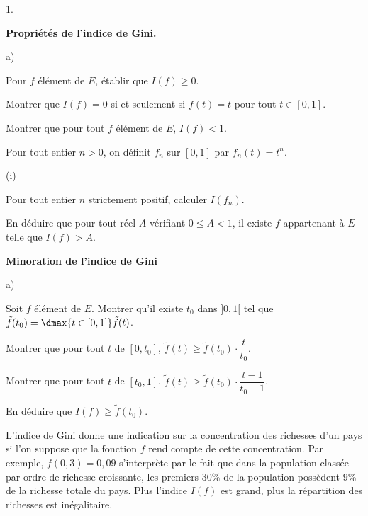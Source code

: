 \begin{noliste}{1.}
 \item \textbf{Propriétés de l'indice de Gini.}
 \begin{noliste}{a)}
  \item Pour $f$ élément de $E$, établir que $I(f) \geq 0$. 
  
  

  
  \item Montrer que $I(f) =0$ si et seulement si $f(t)=t$ pour tout $t 
  \in [0,1]$. 
  
  
  
  
  
  

  
  \item Montrer que pour tout $f$ élément de $E$, $I(f) < 1$.
  
  

  
  \item Pour tout entier $n >0$, on définit $f_n$ sur $[0,1]$ par 
  $f_n(t)=t^n$.
  \begin{nonoliste}{(i)}
    \item Pour tout entier $n$ strictement positif, calculer $I(f_n)$.
    
    

    
    \item En déduire que pour tout réel $A$ vérifiant $0 \leq A <1$, il 
    existe $f$ appartenant à $E$ telle que $I(f)>A$. 
    
    

  \end{nonoliste}
 \end{noliste}
 
 \item \textbf{Minoration de l'indice de Gini} 
 \begin{noliste}{a)}
  \item Soit $f$ élément de $E$. Montrer qu'il existe $t_0$ dans 
  $]0,1[$ tel que $\tilde{f}(t_0)= \dmax{t \in [0,1]} \tilde{f}(t)$. 
  
  

 
  \item Montrer que pour tout $t$ de $[0,t_0]$, $\tilde{f}(t) \geq 
  \tilde{f}(t_0) \cdot \dfrac{t}{t_0}$. 
  
  

  
  \item Montrer que pour tout $t$ de $[t_0,1]$, $\tilde{f}(t) \geq 
  \tilde{f}(t_0) \cdot \dfrac{t-1}{t_0-1}$. 
  
  
  
  \item En déduire que $I(f) \geq \tilde{f}(t_0)$. 
  
  

 \end{noliste}
 L'indice de Gini donne une indication sur la concentration des 
 richesses d'un pays si l'on suppose que la fonction $f$ rend compte de 
 cette concentration. Par exemple, $f(0,3)=0,09$ s'interprète par le 
 fait que dans la population classée par ordre de richesse croissante, 
 les premiers $30 \%$ de la population possèdent $9\%$ de la richesse 
 totale du pays. Plus l'indice $I(f)$ est grand, plus la répartition 
 des richesses est inégalitaire.
\end{noliste}
